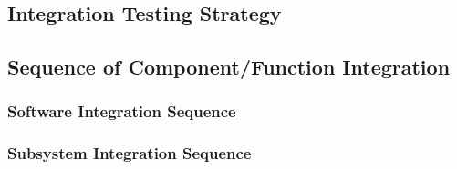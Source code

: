 \subsection{Integration Testing Strategy}

\subsection{Sequence of Component/Function Integration}

\subsubsection{Software Integration Sequence}

\subsubsection{Subsystem Integration Sequence}

